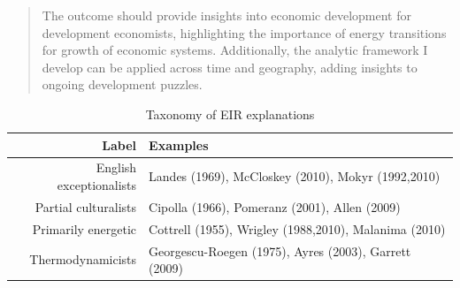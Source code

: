 \documentclass[final]{beamer}
\begin{document}
\begin{frame}
\begin{abstract}
	
	
	
	
	The outcome should provide insights into economic development for development economists, highlighting the importance of energy transitions for growth of economic systems. Additionally, the analytic framework I develop can be applied across time and geography, adding insights to ongoing development puzzles.%
	\end{abstract}
\end{frame}

\begin{frame}
\footnotesize{
\begin{table}[p!]
\caption{Taxonomy of EIR explanations}
\label{tbl:taxonomy}
\begin{tabular}{rl}
Label&Examples\\
\hline
English exceptionalists&Landes (1969), McCloskey (2010), Mokyr (1992,2010)\\
Partial culturalists&Cipolla (1966), Pomeranz (2001), Allen (2009)\\
Primarily energetic&Cottrell (1955), Wrigley (1988,2010), Malanima (2010)\\
Thermodynamicists&Georgescu-Roegen (1975), Ayres (2003), Garrett (2009)\\
\end{tabular}
\end{table}
}
\end{frame}
\end{document}
